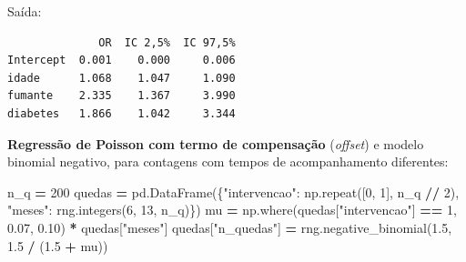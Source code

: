 \documentclass[
]{book}
\newenvironment{Shaded}{\begin{snugshade}}{\end{snugshade}}
\newcommand{\DecValTok}[1]{\textcolor[rgb]{0.00,0.00,0.81}{#1}}
\newcommand{\FloatTok}[1]{\textcolor[rgb]{0.00,0.00,0.81}{#1}}
\newcommand{\NormalTok}[1]{#1}
\newcommand{\OperatorTok}[1]{\textcolor[rgb]{0.81,0.36,0.00}{\textbf{#1}}}
\newcommand{\StringTok}[1]{\textcolor[rgb]{0.31,0.60,0.02}{#1}}
\begin{document}
Saída:

\begin{verbatim}
              OR  IC 2,5%  IC 97,5%
Intercept  0.001    0.000     0.006
idade      1.068    1.047     1.090
fumante    2.335    1.367     3.990
diabetes   1.866    1.042     3.344
\end{verbatim}

\textbf{Regressão de Poisson com termo de compensação} (\emph{offset}) e modelo binomial negativo, para contagens com tempos de acompanhamento diferentes:

\begin{Shaded}
\begin{Highlighting}[]
\NormalTok{n\_q }\OperatorTok{=} \DecValTok{200}
\NormalTok{quedas }\OperatorTok{=}\NormalTok{ pd.DataFrame(\{}\StringTok{"intervencao"}\NormalTok{: np.repeat([}\DecValTok{0}\NormalTok{, }\DecValTok{1}\NormalTok{], n\_q }\OperatorTok{//} \DecValTok{2}\NormalTok{),}
                       \StringTok{"meses"}\NormalTok{: rng.integers(}\DecValTok{6}\NormalTok{, }\DecValTok{13}\NormalTok{, n\_q)\})}
\NormalTok{mu }\OperatorTok{=}\NormalTok{ np.where(quedas[}\StringTok{"intervencao"}\NormalTok{] }\OperatorTok{==} \DecValTok{1}\NormalTok{, }\FloatTok{0.07}\NormalTok{, }\FloatTok{0.10}\NormalTok{) }\OperatorTok{*}\NormalTok{ quedas[}\StringTok{"meses"}\NormalTok{]}
\NormalTok{quedas[}\StringTok{"n\_quedas"}\NormalTok{] }\OperatorTok{=}\NormalTok{ rng.negative\_binomial(}\FloatTok{1.5}\NormalTok{, }\FloatTok{1.5} \OperatorTok{/}\NormalTok{ (}\FloatTok{1.5} \OperatorTok{+}\NormalTok{ mu))}


\end{Highlighting}
\end{Shaded}
\end{document}
